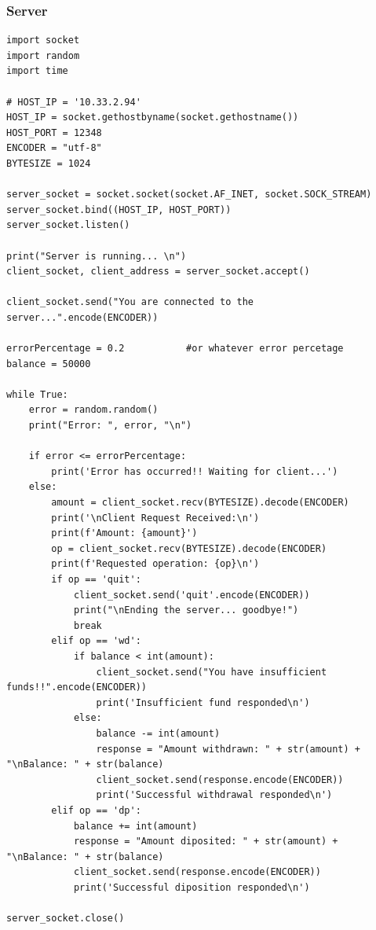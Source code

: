 \documentclass[11pt]{article}
\begin{document}
\subsubsection*{Server}
\begin{verbatim}
import socket
import random
import time

# HOST_IP = '10.33.2.94'
HOST_IP = socket.gethostbyname(socket.gethostname())
HOST_PORT = 12348
ENCODER = "utf-8"
BYTESIZE = 1024

server_socket = socket.socket(socket.AF_INET, socket.SOCK_STREAM)
server_socket.bind((HOST_IP, HOST_PORT))
server_socket.listen()

print("Server is running... \n")
client_socket, client_address = server_socket.accept()

client_socket.send("You are connected to the server...".encode(ENCODER))

errorPercentage = 0.2           #or whatever error percetage
balance = 50000

while True:
    error = random.random()
    print("Error: ", error, "\n")

    if error <= errorPercentage:
        print('Error has occurred!! Waiting for client...')
    else:
        amount = client_socket.recv(BYTESIZE).decode(ENCODER)
        print('\nClient Request Received:\n')
        print(f'Amount: {amount}')
        op = client_socket.recv(BYTESIZE).decode(ENCODER)
        print(f'Requested operation: {op}\n')
        if op == 'quit':
            client_socket.send('quit'.encode(ENCODER))
            print("\nEnding the server... goodbye!")
            break
        elif op == 'wd':
            if balance < int(amount):
                client_socket.send("You have insufficient funds!!".encode(ENCODER))
                print('Insufficient fund responded\n')
            else:
                balance -= int(amount)
                response = "Amount withdrawn: " + str(amount) + "\nBalance: " + str(balance)
                client_socket.send(response.encode(ENCODER))
                print('Successful withdrawal responded\n')
        elif op == 'dp':
            balance += int(amount)
            response = "Amount diposited: " + str(amount) + "\nBalance: " + str(balance)
            client_socket.send(response.encode(ENCODER))
            print('Successful diposition responded\n')

server_socket.close()
\end{verbatim}
\end{document}
